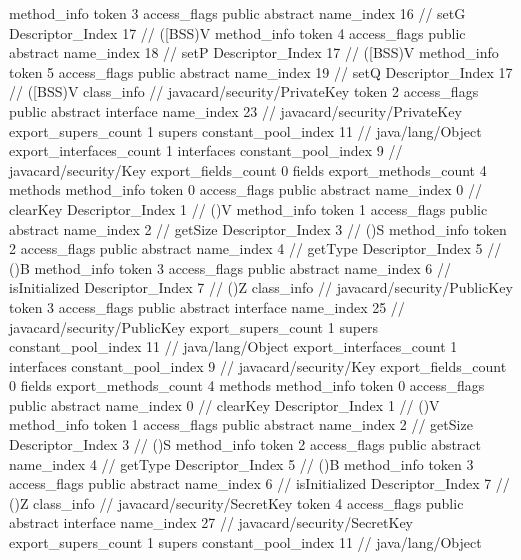{{{{{				}
				method_info {
					token	3
					access_flags	public abstract
					name_index	16		// setG
					Descriptor_Index	17		// ([BSS)V
				}
				method_info {
					token	4
					access_flags	public abstract
					name_index	18		// setP
					Descriptor_Index	17		// ([BSS)V
				}
				method_info {
					token	5
					access_flags	public abstract
					name_index	19		// setQ
					Descriptor_Index	17		// ([BSS)V
				}
			}
		}
		class_info {		// javacard/security/PrivateKey
			token	2
			access_flags	public abstract interface
			name_index	23		// javacard/security/PrivateKey
			export_supers_count	1
			supers {
				constant_pool_index	11		// java/lang/Object
			}
			export_interfaces_count	1
			interfaces {
				constant_pool_index	9		// javacard/security/Key
			}
			export_fields_count	0
			fields {
			}
			export_methods_count	4
			methods {
				method_info {
					token	0
					access_flags	public abstract
					name_index	0		// clearKey
					Descriptor_Index	1		// ()V
				}
				method_info {
					token	1
					access_flags	public abstract
					name_index	2		// getSize
					Descriptor_Index	3		// ()S
				}
				method_info {
					token	2
					access_flags	public abstract
					name_index	4		// getType
					Descriptor_Index	5		// ()B
				}
				method_info {
					token	3
					access_flags	public abstract
					name_index	6		// isInitialized
					Descriptor_Index	7		// ()Z
				}
			}
		}
		class_info {		// javacard/security/PublicKey
			token	3
			access_flags	public abstract interface
			name_index	25		// javacard/security/PublicKey
			export_supers_count	1
			supers {
				constant_pool_index	11		// java/lang/Object
			}
			export_interfaces_count	1
			interfaces {
				constant_pool_index	9		// javacard/security/Key
			}
			export_fields_count	0
			fields {
			}
			export_methods_count	4
			methods {
				method_info {
					token	0
					access_flags	public abstract
					name_index	0		// clearKey
					Descriptor_Index	1		// ()V
				}
				method_info {
					token	1
					access_flags	public abstract
					name_index	2		// getSize
					Descriptor_Index	3		// ()S
				}
				method_info {
					token	2
					access_flags	public abstract
					name_index	4		// getType
					Descriptor_Index	5		// ()B
				}
				method_info {
					token	3
					access_flags	public abstract
					name_index	6		// isInitialized
					Descriptor_Index	7		// ()Z
				}
			}
		}
		class_info {		// javacard/security/SecretKey
			token	4
			access_flags	public abstract interface
			name_index	27		// javacard/security/SecretKey
			export_supers_count	1
			supers {
				constant_pool_index	11		// java/lang/Object
			}
}}}

